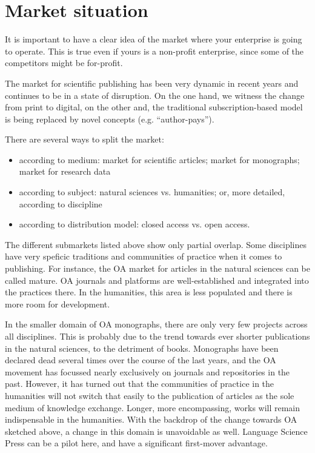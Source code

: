\documentclass[nonflat,smallfont
]{langsci/langscibook}
\newcommand{\background}[1]{ 
  \vspace{5mm}
  \renewcommand{\tblslinecolour}{lsDarkBlue}
  \tblssy[red]{explore2}{Background}{\vspace*{-5mm}#1}
}
\newcommand{\langscisolution}[1]{
  \renewcommand{\tblslinecolour}{lsLightBlue}
  \tblssy{langsci}{LangSci solution}{\vspace*{-5mm}#1}
}
\renewcommand{\tblssy}[4][black!12]{%
  \renewcommand{\langscisymbol}{#2}\renewcommand{\tblsboxcolor}{#1}
  \begin{mdframed}[style=yellowexercise,frametitle={#3}]
    #4
  \end{mdframed}
}
\begin{document}
\section{Market situation}
\vspace*{5mm}\background{It is important to have a clear idea of the market where your enterprise is going to operate. This is true even if yours is a non-profit enterprise, since some of the competitors might be for-profit. }
\langscisolution{
The market for scientific publishing has been very dynamic in recent years and continues to be in a state of disruption. On the one hand, we witness the change from print to digital, on the other and, the traditional subscription-based model is being replaced by novel concepts (e.g. ``author-pays''). 

There are several ways to split the market: 
\begin{itemize}
\sloppy
 \item according to medium: market for scientific articles; market for monographs; market for research data
 \item according to subject: natural sciences vs. humanities; or, more detailed, according to discipline
 \item according to distribution model: closed access vs. open access.
\end{itemize}
 
The different submarkets listed above show only partial overlap. Some disciplines have very speficic traditions and communities of practice when it comes to publishing. For instance, the OA market for articles in the natural sciences can be called mature. OA journals and platforms are well-established and integrated into the practices there. In the humanities, this area is less populated and there is more room for development.

In the smaller domain of OA monographs, there are only very few projects across all disciplines. This is probably due to the trend towards ever shorter publications in the natural sciences, to the detriment of books. Monographs have been declared dead several times over the course of the last years, and the OA movement has focussed nearly exclusively on journals and repositories in the past. However, it has turned out that the communities of practice in the humanities will not switch that easily to the publication of articles as the sole medium of knowledge exchange. Longer, more encompassing, works will remain indispensable in the humanities. With the backdrop of the change towards OA sketched above, a change in this domain is unavoidable as well. Language Science Press can be a pilot here, and have a significant first-mover advantage. 
}
\end{document}
